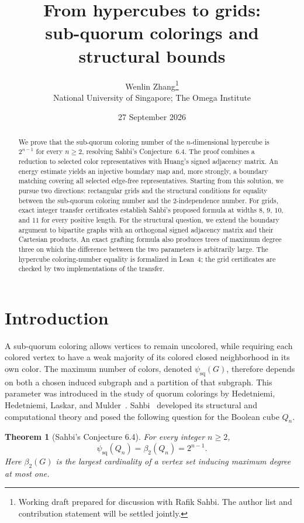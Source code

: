 \documentclass[11pt]{article}
\title{From hypercubes to grids:\\sub-quorum colorings and structural bounds}
\author{Wenlin Zhang\thanks{Working draft prepared for discussion with Rafik Sahbi.
The author list and contribution statement will be settled jointly.}\\
\small National University of Singapore; The Omega Institute}
\date{27 September 2026}
\newtheorem{theorem}{Theorem}[section]
\theoremstyle{definition}
\theoremstyle{remark}
\newcommand{\psq}{\psi_{\mathrm{sq}}}
\newcommand{\bii}{\beta_2}
\begin{document}
\maketitle
\begin{abstract}
We prove that the sub-quorum coloring number of the $n$-dimensional
hypercube is $2^{n-1}$ for every $n\ge2$, resolving Sahbi's Conjecture~6.4.
The proof combines a reduction to selected color representatives with
Huang's signed adjacency matrix. An energy estimate yields an injective
boundary map and, more strongly, a boundary matching covering all selected
edge-free representatives. Starting from this solution, we pursue two
directions: rectangular grids and the structural conditions for equality
between the sub-quorum coloring number and the $2$-independence number.
For grids, exact integer transfer certificates establish Sahbi's proposed
formula at widths $8$, $9$, $10$, and $11$ for every positive length.
For the structural question, we extend the boundary argument to bipartite
graphs with an orthogonal signed adjacency matrix and their Cartesian
products. An exact grafting formula also produces trees of maximum degree
three on which the difference between the two parameters is arbitrarily
large. The hypercube coloring-number equality is formalized in Lean~4;
the grid certificates are checked by two implementations of the transfer.
\end{abstract}

\section{Introduction}

A sub-quorum coloring allows vertices to remain uncolored, while requiring
each colored vertex to have a weak majority of its colored closed
neighborhood in its own color. The maximum number of colors, denoted
$\psq(G)$, therefore depends on both a chosen induced subgraph and a
partition of that subgraph. This parameter was introduced in the study of
quorum colorings by Hedetniemi, Hedetniemi, Laskar, and Mulder~\cite{HHLM}.
Sahbi~\cite{Sahbi} developed its structural and computational theory and
posed the following question for the Boolean cube $Q_n$.

\begin{theorem}[Sahbi's Conjecture 6.4]\label{thm:main}
For every integer $n\ge2$,
\[
 \psq(Q_n)=\bii(Q_n)=2^{n-1}.
\]
Here $\bii(G)$ is the largest cardinality of a vertex set inducing maximum
degree at most one.
\end{theorem}
\end{document}
